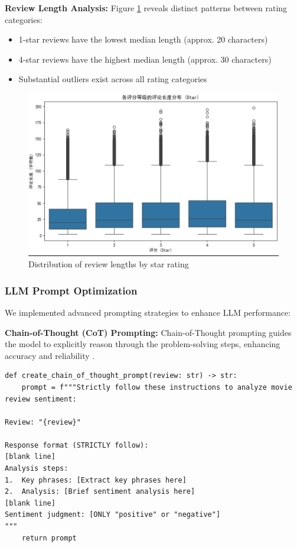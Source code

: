 \documentclass{article}
\begin{document}
\textbf{Review Length Analysis:} 
Figure \ref{fig:length_analysis} reveals distinct patterns between rating categories:
\begin{itemize}
    \item 1-star reviews have the lowest median length (approx. 20 characters)
    \item 4-star reviews have the highest median length (approx. 30 characters)
    \item Substantial outliers exist across all rating categories
\end{itemize}

\begin{figure}[h]
    \centering
    \includegraphics[width=1\columnwidth]{pic/T2P2B1.3.png}
    \caption{Distribution of review lengths by star rating}
    \label{fig:length_analysis}
\end{figure}

\subsubsection{LLM Prompt Optimization}
\label{sssec:prompt_optimization}

We implemented advanced prompting strategies to enhance LLM performance:

\textbf{Chain-of-Thought (CoT) Prompting:}
Chain-of-Thought prompting guides the model to explicitly reason through the problem-solving steps, 
enhancing accuracy and reliability \cite{Wei2022}. 

\begin{lstlisting}[caption={Chain-of-Thought prompt design}]
def create_chain_of_thought_prompt(review: str) -> str:
    prompt = f"""Strictly follow these instructions to analyze movie review sentiment:

Review: "{review}"

Response format (STRICTLY follow):
[blank line]
Analysis steps:
1.  Key phrases: [Extract key phrases here]
2.  Analysis: [Brief sentiment analysis here]
[blank line]
Sentiment judgment: [ONLY "positive" or "negative"]
"""
    return prompt
\end{lstlisting}
\end{document}
